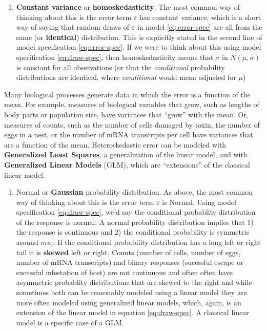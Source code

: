 \documentclass[]{book}
\providecommand{\tightlist}{%
  \setlength{\itemsep}{0pt}\setlength{\parskip}{0pt}}
\begin{document}
\begin{enumerate}
\def\labelenumi{\arabic{enumi}.}
\tightlist
\item
  \textbf{Constant variance} or \textbf{homoskedasticity}. The most common way of thinking about this is the error term \(\varepsilon\) has constant variance, which is a short way of saying that random draws of \(\varepsilon\) in model \eqref{eq:error-spec} are all from the same (or \textbf{identical}) distribution. This is explicitly stated in the second line of model specification \eqref{eq:error-spec}. If we were to think about this using model specification \eqref{eq:draw-spec}, then homoskedasticity means that \(\sigma\) in \(N(\mu, \sigma)\) is constant for all observations (or that the \emph{conditional} probability distributions are identical, where \emph{conditional} would mean adjusted for \(\mu\))
\end{enumerate}

Many biological processes generate data in which the error is a function of the mean. For example, measures of biological variables that grow, such as lengths of body parts or population size, have variances that ``grow'' with the mean. Or, measures of counts, such as the number of cells damaged by toxin, the number of eggs in a nest, or the number of mRNA transcripts per cell have variances that are a function of the mean. Heteroskedastic error can be modeled with \textbf{Generalized Least Squares}, a generalization of the linear model, and with \textbf{Generalized Linear Models} (GLM), which are ``extensions'' of the classical linear model.

\begin{enumerate}
\def\labelenumi{\arabic{enumi}.}
\setcounter{enumi}{1}
\tightlist
\item
  Normal or \textbf{Gaussian} probability distribution. As above, the most common way of thinking about this is the error term \(\varepsilon\) is Normal. Using model specification \eqref{eq:draw-spec}, we'd say the conditional probablity distribution of the response is normal. A normal probability distribution implies that 1) the response is continuous and 2) the conditional probability is symmetric around \(mu_i\). If the conditional probability distribution has a long left or right tail it is \textbf{skewed} left or right. Counts (number of cells, number of eggs, number of mRNA transcripts) and binary responses (sucessful escape or sucessful infestation of host) are not continuous and often often have asymmetric probablity distributions that are skewed to the right and while sometimes both can be reasonably modeled using a linear model they are more often modeled using generalized linear models, which, again, is an extension of the linear model in equation \eqref{eq:draw-spec}. A classical linear model is a specific case of a GLM.
\end{enumerate}
\end{document}
